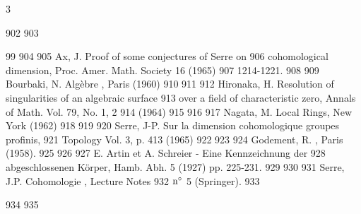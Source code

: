 3	\documentclass[10pt]{../fichiers-configuration-latex/smfart}
\begin{document}
   902	
   903	\begin{thebibliography}{99}
   904	 
   905	Ax, J.  Proof of some conjectures of Serre on
   906	cohomological dimension, Proc. Amer. Math. Society 16 (1965)
   907	1214-1221.
   908	
   909	 Bourbaki, N. Algèbre , Paris (1960)
   910	
   911	 
   912	Hironaka, H.  Resolution of singularities of an algebraic surface
   913	over a field of characteristic zero, Annals of Math. Vol. 79, No. 1, 2
   914	(1964)
   915	
   916	 
   917	 Nagata, M. Local Rings, New York (1962)
   918	
   919	 
   920	Serre, J-P.  Sur la dimension cohomologique  groupes profinis,
   921	Topology Vol. 3, p. 413 (1965)
   922	
   923	
   924	 Godement, R. , Paris (1958).
   925	
   926	 
   927	E. Artin et A.  Schreier - Eine Kennzeichnung der 
   928	abgeschlossenen Körper, Hamb. Abh. 5 (1927) pp. 225-231.
   929	
   930	
   931	 Serre, J.P. Cohomologie , Lecture Notes
   932	${\rm n^{\circ}}$ 5 (Springer).
   933	\end{thebibliography}
   934	
   935	\ifx\danslelivre{}	
\end{document}
